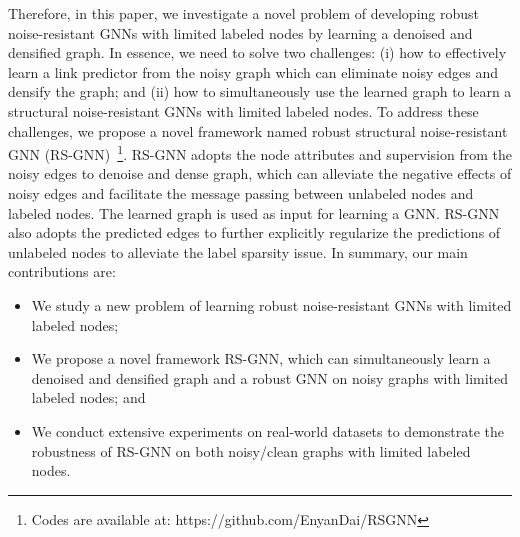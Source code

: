 Therefore, in this paper, we investigate a novel problem of developing robust noise-resistant GNNs with limited labeled nodes by learning a denoised and densified graph. In essence, we need to solve two challenges: (i) how to effectively learn a link predictor from the noisy graph which can eliminate noisy edges and densify the graph; and (ii) how to simultaneously use the learned graph to learn a structural noise-resistant GNNs with limited labeled nodes. To address these challenges, we propose a novel framework named 
robust structural noise-resistant GNN (RS-GNN)~\footnote{Codes are available at: https://github.com/EnyanDai/RSGNN}. RS-GNN adopts the node attributes and supervision from the noisy edges to
denoise and dense graph, which can alleviate the negative effects of noisy edges and facilitate the message passing between unlabeled nodes and labeled nodes. The learned graph is used as input for learning a GNN. RS-GNN also adopts the predicted edges to further explicitly regularize the predictions of unlabeled nodes to alleviate the label sparsity issue. In summary, our main contributions are:
\begin{itemize}[leftmargin=*]
    \item We study a new problem of learning robust noise-resistant GNNs with limited labeled nodes;
    \item We propose a novel framework RS-GNN, which can simultaneously learn a denoised and densified graph and a robust GNN on noisy graphs with limited labeled nodes; and
    \item We conduct extensive experiments on real-world datasets to demonstrate the robustness of RS-GNN on both noisy/clean graphs with limited labeled nodes. 
\end{itemize}
